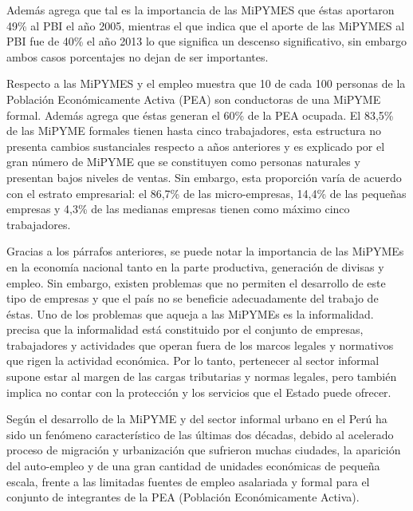 Además \cite{arbulu} agrega que tal es la importancia de las MiPYMES que éstas aportaron
49\% al PBI el año 2005, mientras el que \citep{produce} indica que el aporte
de las MiPYMES al PBI fue de 40\% el año 2013 lo que significa un descenso significativo,
sin embargo ambos casos porcentajes no dejan de ser importantes.

Respecto a las MiPYMES y el empleo \cite{produce2} muestra que 10 de cada 100 personas
de la Población Económicamente Activa (PEA) son conductoras de una MiPYME formal.
Además agrega que éstas generan el 60\% de la PEA ocupada. El 83,5\% de las
MiPYME formales tienen hasta cinco trabajadores, esta estructura no presenta cambios
sustanciales respecto a años anteriores y es explicado por el gran número de
MiPYME que se constituyen como personas naturales y presentan bajos niveles de
ventas. Sin embargo, esta proporción varía de acuerdo con el estrato empresarial:
el 86,7\% de las micro-empresas, 14,4\% de las pequeñas empresas y 4,3\% de las
medianas empresas tienen como máximo cinco trabajadores.

Gracias a los párrafos anteriores, se puede notar la importancia de las MiPYMEs en
la economía nacional tanto en la parte productiva, generación de divisas y empleo.
Sin embargo, existen problemas que no permiten el desarrollo de este tipo de empresas
y que el país no se beneficie adecuadamente del trabajo de éstas. Uno de los problemas que aqueja a
las MiPYMEs es la informalidad. \cite{loayza} precisa que la informalidad está
constituido por el conjunto de empresas, trabajadores y actividades que operan
fuera de los marcos legales y normativos que rigen la actividad económica. Por
lo tanto, pertenecer al sector informal supone estar al margen de las cargas
tributarias y normas legales, pero también implica no contar con la protección
y los servicios que el Estado puede ofrecer.

Según \cite{arbulu} el desarrollo de la MiPYME y del sector informal urbano
en el Perú ha sido un fenómeno característico de las últimas dos
décadas, debido al acelerado proceso de migración y urbanización que
sufrieron muchas ciudades, la aparición del auto-empleo y de una gran cantidad
de unidades económicas de pequeña escala, frente a las limitadas fuentes
de empleo asalariada y formal para el conjunto de integrantes de la PEA (Población
Económicamente Activa).

